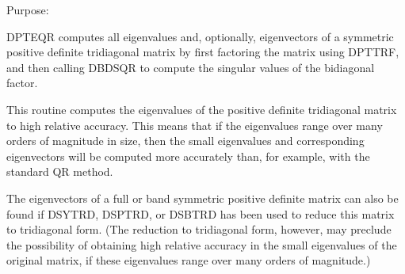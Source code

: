  \begin{DoxyParagraph}{Purpose\+: }
\begin{DoxyVerb} DPTEQR computes all eigenvalues and, optionally, eigenvectors of a
 symmetric positive definite tridiagonal matrix by first factoring the
 matrix using DPTTRF, and then calling DBDSQR to compute the singular
 values of the bidiagonal factor.

 This routine computes the eigenvalues of the positive definite
 tridiagonal matrix to high relative accuracy.  This means that if the
 eigenvalues range over many orders of magnitude in size, then the
 small eigenvalues and corresponding eigenvectors will be computed
 more accurately than, for example, with the standard QR method.

 The eigenvectors of a full or band symmetric positive definite matrix
 can also be found if DSYTRD, DSPTRD, or DSBTRD has been used to
 reduce this matrix to tridiagonal form. (The reduction to tridiagonal
 form, however, may preclude the possibility of obtaining high
 relative accuracy in the small eigenvalues of the original matrix, if
 these eigenvalues range over many orders of magnitude.)\end{DoxyVerb}
 
\end{DoxyParagraph}

